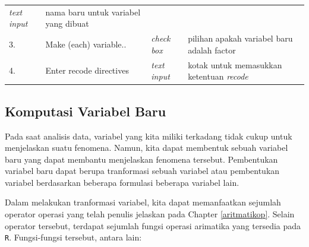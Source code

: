 \documentclass[12pt,]{krantz}
\begin{document}
\begin{longtable}[]{@{}llll@{}}
\begin{minipage}[t]{0.15\columnwidth}
\emph{text input}\strut
\end{minipage} & \begin{minipage}[t]{0.43\columnwidth}\raggedright
nama baru untuk variabel yang dibuat\strut
\end{minipage}\tabularnewline
\begin{minipage}[t]{0.07\columnwidth}\raggedright
3.\strut
\end{minipage} & \begin{minipage}[t]{0.23\columnwidth}\raggedright
Make (each) variable..\strut
\end{minipage} & \begin{minipage}[t]{0.15\columnwidth}\raggedright
\emph{check box}\strut
\end{minipage} & \begin{minipage}[t]{0.43\columnwidth}\raggedright
pilihan apakah variabel baru adalah factor\strut
\end{minipage}\tabularnewline
\begin{minipage}[t]{0.07\columnwidth}\raggedright
4.\strut
\end{minipage} & \begin{minipage}[t]{0.23\columnwidth}\raggedright
Enter recode directives\strut
\end{minipage} & \begin{minipage}[t]{0.15\columnwidth}\raggedright
\emph{text input}\strut
\end{minipage} & \begin{minipage}[t]{0.43\columnwidth}\raggedright
kotak untuk memasukkan ketentuan \emph{recode}\strut
\end{minipage}\tabularnewline
\bottomrule
\end{longtable}

\hypertarget{komputasi-variabel-baru}{%
\subsection{Komputasi Variabel Baru}\label{komputasi-variabel-baru}}

Pada saat analisis data, variabel yang kita miliki terkadang tidak cukup untuk menjelaskan suatu fenomena. Namun, kita dapat membentuk sebuah variabel baru yang dapat membantu menjelaskan fenomena tersebut. Pembentukan variabel baru dapat berupa tranformasi sebuah variabel atau pembentukan variabel berdasarkan beberapa formulasi beberapa variabel lain.

Dalam melakukan tranformasi variabel, kita dapat memanfaatkan sejumlah operator operasi yang telah penulis jelaskan pada Chapter \ref{aritmatikop}. Selain operator tersebut, terdapat sejumlah fungsi operasi arimatika yang tersedia pada \texttt{R}. Fungsi-fungsi tersebut, antara lain:
\end{document}
